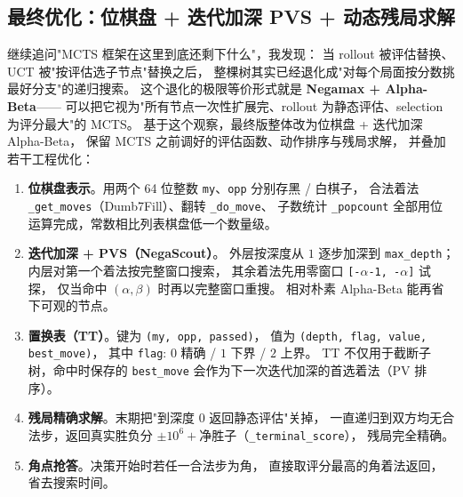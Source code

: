 \documentclass[UTF8,a4paper,11pt]{ctexart}
\begin{document}
\subsection{最终优化：位棋盘 + 迭代加深 PVS + 动态残局求解}

继续追问"MCTS 框架在这里到底还剩下什么"，我发现：
当 rollout 被评估替换、UCT 被"按评估选子节点"替换之后，
整棵树其实已经退化成"对每个局面按分数挑最好分支"的递归搜索。
这个退化的极限等价形式就是 \textbf{Negamax + Alpha-Beta}——
可以把它视为"所有节点一次性扩展完、rollout 为静态评估、selection 为评分最大"的 MCTS。
基于这个观察，最终版整体改为位棋盘 + 迭代加深 Alpha-Beta，
保留 MCTS 之前调好的评估函数、动作排序与残局求解，
并叠加若干工程优化：

\begin{enumerate}[leftmargin=1.5em,itemsep=2pt]
    \item \textbf{位棋盘表示}。用两个 64 位整数 \texttt{my}、\texttt{opp} 分别存黑 / 白棋子，
          合法着法 \texttt{\_get\_moves}（Dumb7Fill）、翻转 \texttt{\_do\_move}、
          子数统计 \texttt{\_popcount} 全部用位运算完成，常数相比列表棋盘低一个数量级。
    \item \textbf{迭代加深 + PVS（NegaScout）}。
          外层按深度从 $1$ 逐步加深到 \texttt{max\_depth}；
          内层对第一个着法按完整窗口搜索，
          其余着法先用零窗口 \texttt{[-$\alpha$-1, -$\alpha$]} 试探，
          仅当命中 $(\alpha, \beta)$ 时再以完整窗口重搜。
          相对朴素 Alpha-Beta 能再省下可观的节点。
    \item \textbf{置换表（TT）}。键为 \texttt{(my, opp, passed)}，
          值为 \texttt{(depth, flag, value, best\_move)}，
          其中 \texttt{flag}: $0$ 精确 / $1$ 下界 / $2$ 上界。
          TT 不仅用于截断子树，命中时保存的 \texttt{best\_move}
          会作为下一次迭代加深的首选着法（PV 排序）。
    \item \textbf{残局精确求解}。末期把"到深度 0 返回静态评估"关掉，
          一直递归到双方均无合法步，返回真实胜负分
          $\pm 10^{6} + \text{净胜子}$（\texttt{\_terminal\_score}），
          残局完全精确。
    \item \textbf{角点抢答}。决策开始时若任一合法步为角，
          直接取评分最高的角着法返回，省去搜索时间。
\end{enumerate}
\end{document}
